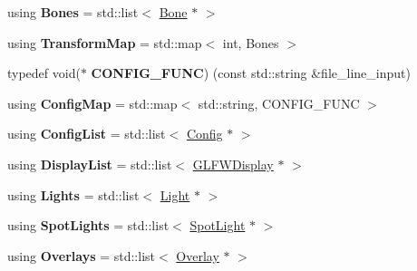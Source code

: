 \begin{DoxyCompactItemize}
\item 
\hypertarget{namespaceEngine_a3da635ce7f63aa33b32b941a4a4ec3fd}{}using {\bfseries Bones} = std\+::list$<$ \hyperlink{classEngine_1_1Bone}{Bone} $\ast$ $>$\label{namespaceEngine_a3da635ce7f63aa33b32b941a4a4ec3fd}

\item 
\hypertarget{namespaceEngine_afcd9892be9af0ef536bee4f783d504af}{}using {\bfseries Transform\+Map} = std\+::map$<$ int, Bones $>$\label{namespaceEngine_afcd9892be9af0ef536bee4f783d504af}

\item 
\hypertarget{namespaceEngine_aecae2f730818f9e6e21934b4cb4c635b}{}typedef void($\ast$ {\bfseries C\+O\+N\+F\+I\+G\+\_\+\+F\+U\+N\+C}) (const std\+::string \&file\+\_\+line\+\_\+input)\label{namespaceEngine_aecae2f730818f9e6e21934b4cb4c635b}

\item 
\hypertarget{namespaceEngine_abbcc9e916a71d0a868ddcf6f8f85329c}{}using {\bfseries Config\+Map} = std\+::map$<$ std\+::string, C\+O\+N\+F\+I\+G\+\_\+\+F\+U\+N\+C $>$\label{namespaceEngine_abbcc9e916a71d0a868ddcf6f8f85329c}

\item 
\hypertarget{namespaceEngine_a2dfbf06e9ffdd3ebfb240db069944cb9}{}using {\bfseries Config\+List} = std\+::list$<$ \hyperlink{classEngine_1_1Config}{Config} $\ast$ $>$\label{namespaceEngine_a2dfbf06e9ffdd3ebfb240db069944cb9}

\item 
\hypertarget{namespaceEngine_aa1f7f0839b31b4d6be2f98f0d54322f3}{}using {\bfseries Display\+List} = std\+::list$<$ \hyperlink{classEngine_1_1GLFWDisplay}{G\+L\+F\+W\+Display} $\ast$ $>$\label{namespaceEngine_aa1f7f0839b31b4d6be2f98f0d54322f3}

\item 
\hypertarget{namespaceEngine_a186bd7a7dd051daffa592a2c32a4204b}{}using {\bfseries Lights} = std\+::list$<$ \hyperlink{classEngine_1_1Light}{Light} $\ast$ $>$\label{namespaceEngine_a186bd7a7dd051daffa592a2c32a4204b}

\item 
\hypertarget{namespaceEngine_a521d56b9b47219465081dfb545d00de1}{}using {\bfseries Spot\+Lights} = std\+::list$<$ \hyperlink{classEngine_1_1SpotLight}{Spot\+Light} $\ast$ $>$\label{namespaceEngine_a521d56b9b47219465081dfb545d00de1}

\item 
\hypertarget{namespaceEngine_a7bd506f975ee9d54c7429cc851d50fd5}{}using {\bfseries Overlays} = std\+::list$<$ \hyperlink{classEngine_1_1Overlay}{Overlay} $\ast$ $>$\label{namespaceEngine_a7bd506f975ee9d54c7429cc851d50fd5}


\end{DoxyCompactItemize}
